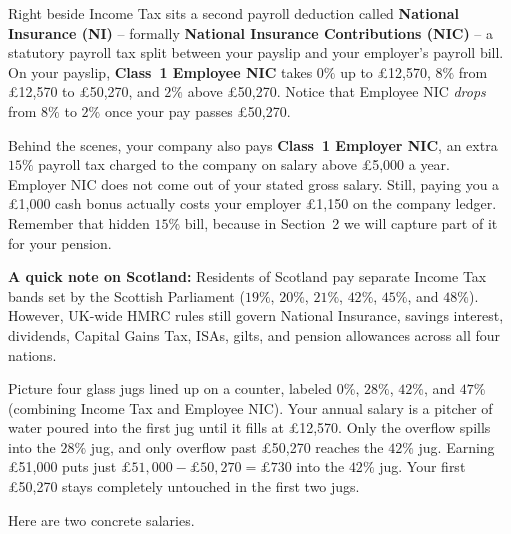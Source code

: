 Right beside Income Tax sits a second payroll deduction called \textbf{National Insurance (NI)} -- formally \textbf{National Insurance Contributions (NIC)} -- a statutory payroll tax split between your payslip and your employer's payroll bill. On your payslip, \textbf{Class~1 Employee NIC} takes $0\%$ up to \pounds 12,570, \textbf{$8\%$} from \pounds 12,570 to \pounds 50,270, and \textbf{$2\%$} above \pounds 50,270. Notice that Employee NIC \emph{drops} from $8\%$ to $2\%$ once your pay passes \pounds 50,270.

Behind the scenes, your company also pays \textbf{Class~1 Employer NIC}, an extra \textbf{$15\%$} payroll tax charged to the company on salary above \pounds 5,000 a year. Employer NIC does not come out of your stated gross salary. Still, paying you a \pounds 1,000 cash bonus actually costs your employer \pounds 1,150 on the company ledger. Remember that hidden $15\%$ bill, because in Section~2 we will capture part of it for your pension.

\begin{marginnotebox}
\textbf{A quick note on Scotland:} Residents of Scotland pay separate Income Tax bands set by the Scottish Parliament ($19\%$, $20\%$, $21\%$, $42\%$, $45\%$, and $48\%$). However, UK-wide HMRC rules still govern National Insurance, savings interest, dividends, Capital Gains Tax, ISAs, gilts, and pension allowances across all four nations.
\end{marginnotebox}

\begin{intuitionbox}
Picture four glass jugs lined up on a counter, labeled $0\%$, $28\%$, $42\%$, and $47\%$ (combining Income Tax and Employee NIC). Your annual salary is a pitcher of water poured into the first jug until it fills at \pounds 12,570. Only the overflow spills into the $28\%$ jug, and only overflow past \pounds 50,270 reaches the $42\%$ jug. Earning \pounds 51,000 puts just $\pounds 51{,}000 - \pounds 50{,}270 = \pounds 730$ into the $42\%$ jug. Your first \pounds 50,270 stays completely untouched in the first two jugs.
\end{intuitionbox}

Here are two concrete salaries.


